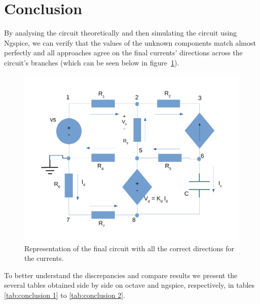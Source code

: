 \newpage
\section{Conclusion}
\label{sec:conclusion}

By analysing the circuit theoretically and then simulating the circuit using Ngspice, we can verify that the values of the unknown components match almost perfectly and all approaches agree on the final currents' directions across the circuit's branches (which can be seen below in figure~\ref{fig:circuit_final}).

\begin{figure}[!ht] \centering
\includegraphics[width=0.8\linewidth]{circuit_final.pdf}
\caption{Representation of the final circuit with all the correct directions for the currents.}
\label{fig:circuit_final}
\end{figure}

To better understand the discrepancies and compare results we present the several tables obtained side by side on octave and ngspice, respectively, in tables \ref{tab:conclusion 1} to \ref{tab:conclusion 2}.

